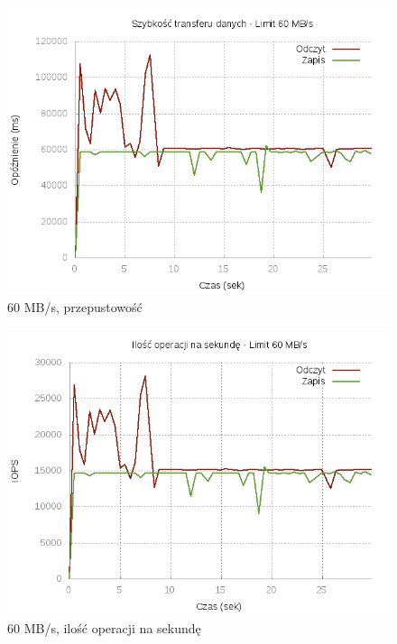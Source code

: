 \begin{figure}[h]
	\centering
	\includegraphics[scale=0.9]{results/60_bw.png}
		\caption{60 MB/s, przepustowość}
    \label{fig:60-bw}
\end{figure}
\begin{figure}[h]
	\centering
	\includegraphics[scale=0.9]{results/60_iops.png}
		\caption{60 MB/s, ilość operacji na sekundę}
    \label{fig:60-iops}
\end{figure}
